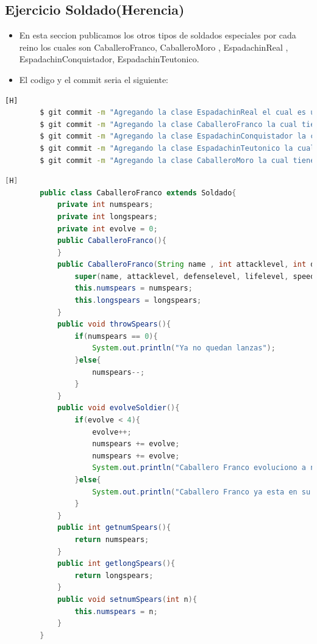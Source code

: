 \documentclass{article}
\begin{document}
	\subsection{Ejercicio Soldado(Herencia)}
	\begin{itemize}	
		\item En esta seccion publicamos los otros tipos de soldados especiales por cada reino los cuales son CaballeroFranco, CaballeroMoro , EspadachinReal , EspadachinConquistador, EspadachinTeutonico.
		\item El codigo y el commit seria el siguiente:
	\end{itemize}	
	\begin{lstlisting}[language=bash,caption={Commit}][H]
		$ git commit -m "Agregando la clase EspadachinReal el cual es una unidad especial para el reino de inglaterra creamos sus metodos y sus atributos necesarios"
		$ git commit -m "Agregando la clase CaballeroFranco la cual tiene sus metodos , getters y setters, y sus debidos atributos"
		$ git commit -m "Agregando la clase EspadachinConquistador la cual tiene sus metodos,getters y setters, y sus debidos atributos"
		$ git commit -m "Agregando la clase EspadachinTeutonico la cual tiene sus metodos como el modoTortuga() y otros, getters y setters, y sus debidos atributos"
		$ git commit -m "Agregando la clase CaballeroMoro la cual tiene sus metodos, getters y setters, y sus debidos atributos"
	\end{lstlisting}	
	\begin{lstlisting}[language=java,caption={Las lineas de codigos de la clase CaballeroFranco:}][H]
		public class CaballeroFranco extends Soldado{
			private int numspears;
			private int longspears;
			private int evolve = 0;
			public CaballeroFranco(){
			}
			public CaballeroFranco(String name , int attacklevel, int defenselevel, int lifelevel, int speed, String attitude ,boolean lives, int row, String column,int numspears, int longspears){
				super(name, attacklevel, defenselevel, lifelevel, speed, attitude, lives, row, column);
				this.numspears = numspears;
				this.longspears = longspears;
			}
			public void throwSpears(){
				if(numspears == 0){
					System.out.println("Ya no quedan lanzas");
				}else{
					numspears--;
				}
			}
			public void evolveSoldier(){
				if(evolve < 4){
					evolve++;
					numspears += evolve;
					numspears += evolve;
					System.out.println("Caballero Franco evoluciono a nivel " + evolve);
				}else{
					System.out.println("Caballero Franco ya esta en su nivel maximo de evolucion.");
				}
			}
			public int getnumSpears(){
				return numspears;
			}
			public int getlongSpears(){
				return longspears;
			}
			public void setnumSpears(int n){
				this.numspears = n;
			}
		}
	\end{lstlisting}
\end{document}
